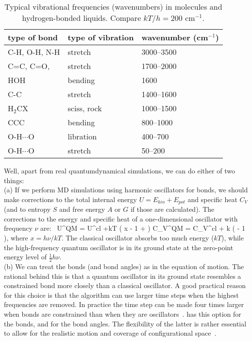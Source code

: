 \begin{table}[H]
\begin{center} 
\begin{tabular}{|l|l|l|}
\hline
type of bond & type of vibration & wavenumber  (cm$^{-1}$) \\ \hline
C-H, O-H, N-H   &  stretch   &  3000--3500 \\
C=C, C=O,       &  stretch   & 1700--2000 \\
HOH             &  bending   &  1600 \\
C-C             &  stretch   & 1400--1600 \\
H$_2$CX         & sciss, rock & 1000--1500 \\ 
CCC             &  bending   & 800--1000 \\
O-H$\cdots$O    &  libration & 400--700 \\
O-H$\cdots$O    &  stretch   &  50--200 \\
\hline
\end{tabular} 
\end{center} 
\caption{Typical vibrational frequencies (wavenumbers) in molecules and hydrogen-bonded liquids. Compare $kT/h = 200$ cm$^{-1}$.}
\label{tab:vibrations}
\end{table}

Well, apart from real quantumdynamical simulations, we can do either
of two things: \\ 
 (a) If we perform MD simulations using harmonic oscillators for
bonds, we should make corrections to the total internal energy $U =
E_{kin} + E_{pot}$ and specific heat $C_V$ (and to entropy $S$ and
free energy $A$ or $G$ if those are calculated). The corrections to
the energy and specific heat of a one-dimensional oscillator with
frequency $\nu$ are:~\cite{McQuarrie76}
\beq
 U^{QM} = U^{cl} +kT \left( \half x - 1 +  \right)
\eeq
\beq
 C_V^{QM} = C_V^{cl} + k \left(  - 1 \right), 
\eeq
where $x=h\nu /kT$. The classical oscillator absorbs too much energy
($kT$), while the high-frequency quantum oscillator is in its ground
state at the zero-point energy level of $\frac{1}{2} h\nu$. \\ 
(b) We can treat the bonds (and bond angles) as {\em {}} in
the equation of motion. The rational behind this is that a quantum
oscillator in its ground state resembles a constrained bond more
closely than a classical oscillator. A good practical reason for this
choice is that the algorithm can use larger time steps when the
highest frequencies are removed. In practice the time step can be made
four times larger when bonds are constrained than when they are
oscillators~\cite{Gunsteren77}. {\gromacs} has this option for the
bonds, and for the bond angles.  The flexibility of the latter is
rather essential to allow for the realistic motion and coverage of
configurational space~\cite{Gunsteren77}.    
 
